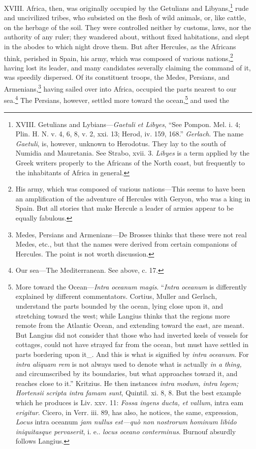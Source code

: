 XVIII. Africa, then, was originally occupied by the Getulians and
Libyans,\footnote{XVIII. Getulians and Lybians—\emph{Gaetuli et Libyes}, ``See
Pompon. Mel. i. 4; Plin. H. N. v. 4, 6, 8, v. 2, xxi. 13; Herod, iv.
159, 168.'' \emph{Gerlach}. The name \emph{Gaetuli}, is, however, unknown to
Herodotus. They lay to the south of Numidia and Mauretania. See
Strabo, xvii. 3. \emph{Libyes} is a term applied by the Greek writers
properly to the Africans of the North coast, but frequently to the
inhabitants of Africa in general.} rude and uncivilized tribes, who subsisted on the flesh
of wild animals, or, like cattle, on the herbage of the soil. They
were controlled neither by customs, laws, nor the authority of any
ruler; they wandered about, without fixed habitations, and slept in
the abodes to which night drove them. But after Hercules, as the
Africans think, perished in Spain, his army, which was composed of
various nations,\footnote{His army, which was composed of various nations—This seems
to have been an amplification of the adventure of Hercules with
Geryon, who was a king in Spain. But all stories that make Hercule
a leader of armies appear to be equally fabulous.} having lost its leader, and many candidates
severally claiming the command of it, was speedily dispersed. Of its
constituent troops, the Medes, Persians, and Armenians,\footnote{Medes, Persians and Armenians—De Brosses thinks that these
were not real Medes, etc., but that the names were derived from
certain companions of Hercules. The point is not worth discussion.} having
sailed over into Africa, occupied the parts nearest to our sea.\footnote{Our sea—The Mediterranean. See above, c. 17.}
The Persians, however, settled more toward the ocean,\footnote{More toward the Ocean—\emph{Intra oceanum magis}. ``\emph{Intra oceanum}
is differently explained by different commentators. Cortius, Muller
and Gerlach, understand the parts bounded by the ocean, lying close
upon it, and stretching toward the west; while Langius thinks that
the regions more remote from the Atlantic Ocean, and extending
toward the east, are meant. But Langius did not consider that those
who had inverted keels of vessels for cottages, could not have
strayed far from the ocean, but must have settled in parts
bordering upon it\_. And this is what is signified by \emph{intra oceanum}.
For \emph{intra aliquam rem} is not always used to denote what is actually
\emph{in a thing,} and circumscribed by its boundaries, but what approaches
toward it, and reaches close to it.'' Kritzius. He then instances
\emph{intra modum, intra legem; Hortensii scripta intra famam sunt},
Quintil. xi. 8, 8. But the best example which he produces is Liv. xxv.
11: \emph{Fossa ingens ducta, et vallum}, intra eam \emph{erigitur}. Cicero, in
Verr. iii. 89, has also, he notices, the same, expression, \emph{Locus}
intra oceanum \emph{jam nullus est—quò non nostrorum hominum libido
iniquitasque pervaserit}, i. e.. \emph{locus oceano conterminus}. Burnouf
absurdly follows Langius.} and used the
